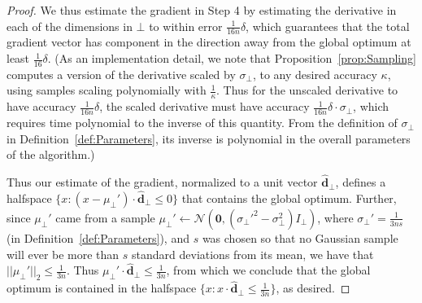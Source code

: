 \documentclass[11pt,letter]{article}
\newcommand{\from}{\leftarrow}
\newcommand{\Normal}{\mathcal{N}}
\renewcommand{\vec}[1]{\mathbf{#1}}
\newcommand{\perr}{\delta}
\newcommand{\safety}{s}
\numberwithin{nTheorems}{section}
\begin{document}
\begin{proof}
We thus estimate the gradient in Step 4 by estimating the derivative in each of the dimensions in $\bot$ to within error $\frac{1}{16n}\perr$, which guarantees that the total gradient vector has component in the direction away from the global optimum at least $\frac{1}{16}\perr$. (As an implementation detail, we note that Proposition~\ref{prop:Sampling} computes a version of the derivative scaled by $\sigma_\bot$, to any desired accuracy $\kappa$, using samples scaling polynomially with $\frac{1}{\kappa}$. Thus for the unscaled derivative to have accuracy $\frac{1}{16n}\perr$, the scaled derivative must have accuracy $\frac{1}{16n}\perr\cdot\sigma_\bot$, which requires time polynomial to the inverse of this quantity. From the definition of $\sigma_\bot$ in Definition~\ref{def:Parameters}, its inverse is polynomial in the overall parameters of the algorithm.)

Thus our estimate of the gradient, normalized to a unit vector $\hat{\vec{d}}_\bot$, defines a halfspace $\{x:(x-\mu_\bot')\cdot \hat{\vec{d}}_\bot \leq 0\}$ that contains the global optimum. Further, since $\mu_\bot'$ came from a sample $\mu_\bot'\from\Normal(\vec{0}, (\sigma_\bot'^2 - \sigma_\bot^2)I_\bot)$, where $\sigma_\bot'=\frac{1}{3n\safety}$ (in Definition~\ref{def:Parameters}), and $\safety$ was chosen so that no Gaussian sample will ever be more than $s$ standard deviations from its mean, we have that $||\mu_\bot'||_2\leq\frac{1}{3n}$. Thus $\mu_\bot'\cdot\hat{\vec{d}}_\bot\leq \frac{1}{3n}$, from which we conclude that the global optimum is contained in the halfspace $\{x:x\cdot \hat{\vec{d}}_\bot\leq \frac{1}{3n}\}$, as desired.


\end{proof}


\fi
\end{document}
